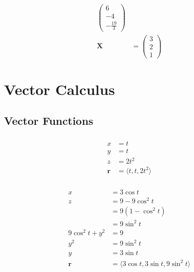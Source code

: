 \documentclass{article}
\begin{document}
\begin{align*}
\begin{pmatrix}
                                    6  \\
                                    -4 \\
                                    -\frac{19}{3}
                                  \end{pmatrix}   \\
  \mathbf{X}                    & = \begin{pmatrix}
                                      3 \\
                                      2 \\
                                      1
                                    \end{pmatrix}
\end{align*}

\section{Vector Calculus}

\subsection{Vector Functions}

\setcounter{subsubsection}{10}
\subsubsection{}

\begin{align*}
  x          & = t                           \\
  y          & = t                           \\
  z          & = 2 t^2                       \\
  \mathbf{r} & = \langle t, t, 2 t^2 \rangle
\end{align*}

\setcounter{subsubsection}{12}
\subsubsection{}

\begin{align*}
  x                & = 3 \cos t                                       \\
  z                & = 9 - 9 \cos^2 t                                 \\
                   & = 9 (1 - \cos^2 t)                               \\
                   & = 9 \sin^2 t                                     \\
  9 \cos^2 t + y^2 & = 9                                              \\
  y^2              & = 9 \sin^2 t                                     \\
  y                & = 3 \sin t                                       \\
  \mathbf{r}       & = \langle 3 \cos t, 3 \sin t, 9 \sin^2 t \rangle
\end{align*}
\end{document}
